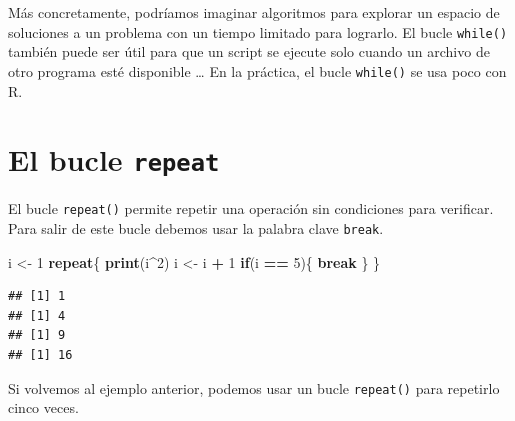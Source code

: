 \documentclass[
]{book}
\newenvironment{Shaded}{\begin{snugshade}}{\end{snugshade}}
\newcommand{\ControlFlowTok}[1]{\textcolor[rgb]{0.13,0.29,0.53}{\textbf{#1}}}
\newcommand{\DecValTok}[1]{\textcolor[rgb]{0.00,0.00,0.81}{#1}}
\newcommand{\KeywordTok}[1]{\textcolor[rgb]{0.13,0.29,0.53}{\textbf{#1}}}
\newcommand{\NormalTok}[1]{#1}
\newcommand{\OperatorTok}[1]{\textcolor[rgb]{0.81,0.36,0.00}{\textbf{#1}}}
\newcommand{\StringTok}[1]{\textcolor[rgb]{0.31,0.60,0.02}{#1}}
\begin{document}
Más concretamente, podríamos imaginar algoritmos para explorar un espacio de soluciones a un problema con un tiempo limitado para lograrlo. El bucle \texttt{while()} también puede ser útil para que un script se ejecute solo cuando un archivo de otro programa esté disponible \ldots{} En la práctica, el bucle \texttt{while()} se usa poco con R.

\hypertarget{l17repeat}{%
\section{\texorpdfstring{El bucle \texttt{repeat}}{El bucle repeat}}\label{l17repeat}}

El bucle \texttt{repeat()} permite repetir una operación sin condiciones para verificar. Para salir de este bucle debemos usar la palabra clave \texttt{break}.

\begin{Shaded}
\begin{Highlighting}[]
\NormalTok{i <-}\StringTok{ }\DecValTok{1}
\ControlFlowTok{repeat}\NormalTok{\{}
  \KeywordTok{print}\NormalTok{(i}\OperatorTok{^}\DecValTok{2}\NormalTok{)}
\NormalTok{  i <-}\StringTok{ }\NormalTok{i }\OperatorTok{+}\StringTok{ }\DecValTok{1}
  \ControlFlowTok{if}\NormalTok{(i }\OperatorTok{==}\StringTok{ }\DecValTok{5}\NormalTok{)\{}
    \ControlFlowTok{break}
\NormalTok{  \}}
\NormalTok{\}}
\end{Highlighting}
\end{Shaded}

\begin{verbatim}
## [1] 1
## [1] 4
## [1] 9
## [1] 16
\end{verbatim}

Si volvemos al ejemplo anterior, podemos usar un bucle \texttt{repeat()} para repetirlo cinco veces.
\end{document}
